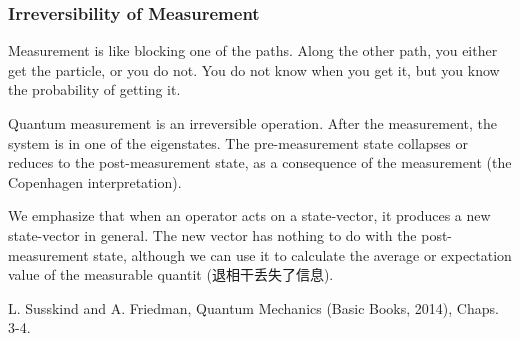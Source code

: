 \subsubsection{Irreversibility of Measurement}
Measurement is like blocking one of the paths. Along the other path, you either get the particle, or you do not. You do not know when you get it, but you know the probability of getting it.

Quantum measurement is an irreversible operation. After the measurement, the system is in one of the eigenstates. The pre-measurement state collapses or reduces to the post-measurement state, as a consequence of the measurement (the Copenhagen interpretation). 

We emphasize that when an operator acts on a state-vector, it produces a new state-vector in general. The new vector has nothing to do with the post-measurement state, although we can use it to calculate the average or expectation value of the measurable quantit (退相干丢失了信息). 

L. Susskind and A. Friedman, Quantum Mechanics (Basic Books, 2014), Chaps. 3-4.